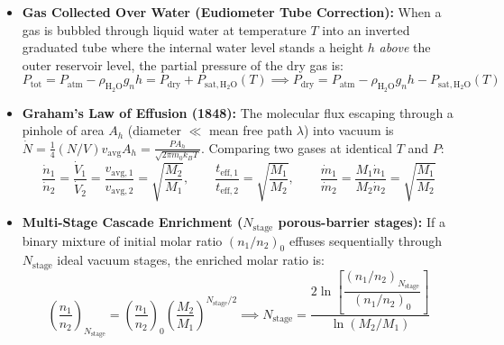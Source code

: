 \begin{formulacard}
\begin{itemize}
  \item \textbf{Gas Collected Over Water (Eudiometer Tube Correction):} When a gas is bubbled through liquid water at temperature $T$ into an inverted graduated tube where the internal water level stands a height $h$ \emph{above} the outer reservoir level, the partial pressure of the dry gas is:
  \begin{equation}\label{eq:06:wet-gas}
    P_{\mathrm{tot}} = P_{\mathrm{atm}} - \rho_{\mathrm{H_2O}} g_n h = P_{\mathrm{dry}} + P_{\mathrm{sat,H_2O}}(T) \implies \boxed{P_{\mathrm{dry}} = P_{\mathrm{atm}} - \rho_{\mathrm{H_2O}} g_n h - P_{\mathrm{sat,H_2O}}(T)}
  \end{equation}
  \item \textbf{Graham's Law of Effusion (1848):} The molecular flux escaping through a pinhole of area $A_h$ (diameter $\ll$ mean free path $\lambda$) into vacuum is $\dot{N} = \frac{1}{4}(N/V)v_{\mathrm{avg}}A_h = \frac{P A_h}{\sqrt{2\pi m_0 k_B T}}$. Comparing two gases at identical $T$ and $P$:
  \begin{equation}\label{eq:06:graham}
    \boxed{\frac{\dot{n}_1}{\dot{n}_2} = \frac{\dot{V}_1}{\dot{V}_2} = \frac{v_{\mathrm{avg},1}}{v_{\mathrm{avg},2}} = \sqrt{\frac{M_2}{M_1}}}, \qquad \frac{t_{\mathrm{eff},1}}{t_{\mathrm{eff},2}} = \sqrt{\frac{M_1}{M_2}}, \qquad \boxed{\frac{\dot{m}_1}{\dot{m}_2} = \frac{M_1\dot{n}_1}{M_2\dot{n}_2} = \sqrt{\frac{M_1}{M_2}}}
  \end{equation}
  \item \textbf{Multi-Stage Cascade Enrichment ($N_{\mathrm{stage}}$ porous-barrier stages):} If a binary mixture of initial molar ratio $(n_1/n_2)_0$ effuses sequentially through $N_{\mathrm{stage}}$ ideal vacuum stages, the enriched molar ratio is:
  \begin{equation}\label{eq:06:graham-cascade}
    \left(\frac{n_1}{n_2}\right)_{N_{\mathrm{stage}}} = \left(\frac{n_1}{n_2}\right)_0 \left(\frac{M_2}{M_1}\right)^{N_{\mathrm{stage}}/2} \implies N_{\mathrm{stage}} = \frac{2\ln\left[\dfrac{(n_1/n_2)_{N_{\mathrm{stage}}}}{(n_1/n_2)_0}\right]}{\ln(M_2/M_1)}
  \end{equation}
\end{itemize}
\end{formulacard}


